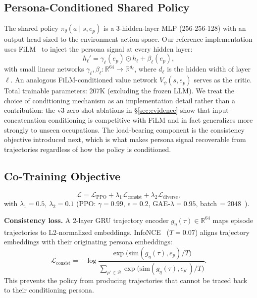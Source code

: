 \documentclass[conference]{IEEEtran}
\begin{document}
\subsection{Persona-Conditioned Shared Policy}

The shared policy $\pi_\theta(a \mid s, e_p)$ is a 3-hidden-layer MLP
(256-256-128) with an output head sized to the environment action space.
Our reference
implementation uses FiLM~\cite{perez2018film} to inject the persona signal at
every hidden layer:
\[
  h_\ell' = \gamma_\ell(e_p) \odot h_\ell + \beta_\ell(e_p),
\]
with small linear networks
$\gamma_\ell, \beta_\ell : \mathbb{R}^{64} \to \mathbb{R}^{d_\ell}$,
where $d_\ell$ is the hidden width of layer $\ell$.
An analogous FiLM-conditioned value network $V_\psi(s, e_p)$ serves as the
critic. Total trainable parameters: 207K (excluding the frozen LLM).
We treat the choice of conditioning mechanism as an implementation detail
rather than a contribution: the v3 zero-shot ablations in
\S\ref{sec:evidence} show that input-concatenation conditioning is competitive
with FiLM and in fact generalizes more strongly to unseen occupations. The
load-bearing component is the consistency objective introduced next, which is
what makes persona signal recoverable from trajectories regardless of how
the policy is conditioned.

\subsection{Co-Training Objective}

\begin{equation}
  \mathcal{L} = \mathcal{L}_{\text{PPO}} + \lambda_1 \mathcal{L}_{\text{consist}}
    + \lambda_2 \mathcal{L}_{\text{diverse}},
\end{equation}
with $\lambda_1\!=\!0.5$, $\lambda_2\!=\!0.1$ (PPO: $\gamma\!=\!0.99$,
$\epsilon\!=\!0.2$, GAE-$\lambda\!=\!0.95$, batch\,$=\!2048$~\cite{schulman2017ppo}).

\textbf{Consistency loss.}
A 2-layer GRU trajectory encoder $g_\eta(\tau) \in \mathbb{R}^{64}$
maps episode trajectories to L2-normalized embeddings.
InfoNCE~\cite{oord2018cpc} ($T\!=\!0.07$) aligns trajectory embeddings with
their originating persona embeddings:
\begin{equation}
  \mathcal{L}_{\text{consist}} = -\log
  \frac{\exp\!\bigl(\text{sim}(g_\eta(\tau), e_p)/T\bigr)}
       {\sum_{p' \in \mathcal{B}} \exp\!\bigl(\text{sim}(g_\eta(\tau), e_{p'})/T\bigr)}.
\end{equation}
This prevents the policy from producing trajectories that cannot be traced back
to their conditioning persona.
\end{document}
